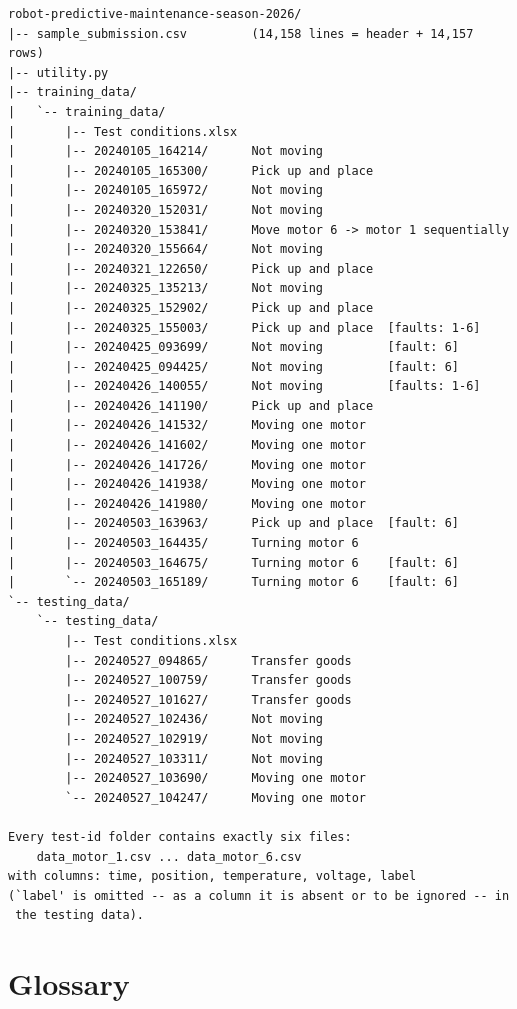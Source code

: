\documentclass[11pt,a4paper]{article}
\begin{document}
\begin{verbatim}
robot-predictive-maintenance-season-2026/
|-- sample_submission.csv         (14,158 lines = header + 14,157 rows)
|-- utility.py
|-- training_data/
|   `-- training_data/
|       |-- Test conditions.xlsx
|       |-- 20240105_164214/      Not moving
|       |-- 20240105_165300/      Pick up and place
|       |-- 20240105_165972/      Not moving
|       |-- 20240320_152031/      Not moving
|       |-- 20240320_153841/      Move motor 6 -> motor 1 sequentially
|       |-- 20240320_155664/      Not moving
|       |-- 20240321_122650/      Pick up and place
|       |-- 20240325_135213/      Not moving
|       |-- 20240325_152902/      Pick up and place
|       |-- 20240325_155003/      Pick up and place  [faults: 1-6]
|       |-- 20240425_093699/      Not moving         [fault: 6]
|       |-- 20240425_094425/      Not moving         [fault: 6]
|       |-- 20240426_140055/      Not moving         [faults: 1-6]
|       |-- 20240426_141190/      Pick up and place
|       |-- 20240426_141532/      Moving one motor
|       |-- 20240426_141602/      Moving one motor
|       |-- 20240426_141726/      Moving one motor
|       |-- 20240426_141938/      Moving one motor
|       |-- 20240426_141980/      Moving one motor
|       |-- 20240503_163963/      Pick up and place  [fault: 6]
|       |-- 20240503_164435/      Turning motor 6
|       |-- 20240503_164675/      Turning motor 6    [fault: 6]
|       `-- 20240503_165189/      Turning motor 6    [fault: 6]
`-- testing_data/
    `-- testing_data/
        |-- Test conditions.xlsx
        |-- 20240527_094865/      Transfer goods
        |-- 20240527_100759/      Transfer goods
        |-- 20240527_101627/      Transfer goods
        |-- 20240527_102436/      Not moving
        |-- 20240527_102919/      Not moving
        |-- 20240527_103311/      Not moving
        |-- 20240527_103690/      Moving one motor
        `-- 20240527_104247/      Moving one motor

Every test-id folder contains exactly six files:
    data_motor_1.csv ... data_motor_6.csv
with columns: time, position, temperature, voltage, label
(`label' is omitted -- as a column it is absent or to be ignored -- in
 the testing data).
\end{verbatim}

\section{Glossary}
\label{sec:appendix-glossary}
\end{document}
